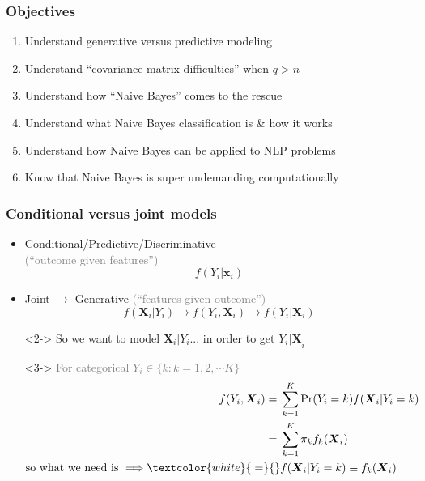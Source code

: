 \documentclass[xcolor={dvipsnames}]{beamer}
\begin{document}
\frame
{
 \frametitle{Objectives}
\begin{enumerate}
\item Understand generative versus predictive modeling
\item<2-> Understand ``covariance matrix difficulties'' when $q > n$
\item<3-> Understand how ``Naive Bayes'' comes to the rescue
\item<4-> Understand what Naive Bayes classification is \& how it works
\item<5-> Understand how Naive Bayes can be applied to NLP problems
\item<6-> Know that Naive Bayes is super undemanding computationally
\end{enumerate}

}


\frame
{
 \frametitle{Conditional versus joint models}
\begin{itemize}
\item Conditional/Predictive/Discriminative\\
\textcolor{gray}{(``outcome given features'')}
$$f(Y_i|{\boldsymbol x}_i)$$
\item<2-> Joint $\rightarrow$ Generative \textcolor{gray}{(``features given outcome'')}
$$f({\boldsymbol X}_i|Y_i) \rightarrow  f(Y_i,{\boldsymbol X}_i) \rightarrow f(Y_i|{\boldsymbol X}_i)$$
\item[]<2-> So we want to model ${\boldsymbol X}_i|Y_i$... in order to get ${Y_i|\boldsymbol X}_i$

\item[]
\item[]<3-> \textcolor{gray}{For categorical $Y_i \in \{k: k = 1,2, \cdots K \}$ 
\begin{align*}
f(Y_i,{\boldsymbol X}_i) = {}& \sum_{k=1}^K \Pr(Y_i=k) f({\boldsymbol X}_i|Y_i=k) \\
= {}& \sum_{k=1}^K \pi_k f_k({\boldsymbol X}_i) \\
\text{so what we need is } \Longrightarrow \textcolor{white}{\;=}{} & f({\boldsymbol X}_i|Y_i=k) \equiv f_k({\boldsymbol X}_i)
\end{align*}}
\end{itemize}
}
\end{document}
